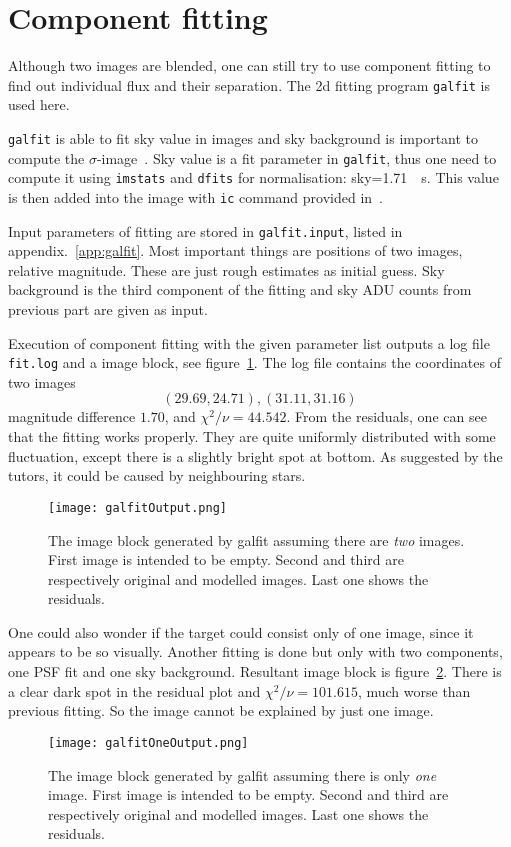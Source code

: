 \clearpage
\section{Component fitting}
Although two images are blended, one can still try to use component fitting to find out individual flux and their separation. The 2d fitting program \verb|galfit| is used here.

\verb|galfit| is able to fit sky value in images and sky background is important to compute the $\sigma$-image~\cite{galfitManual}. Sky value is a fit parameter in \verb|galfit|, thus one need to compute it using \verb|imstats| and \verb|dfits| for normalisation: sky=\SI{1.71}{\per\s}. This value is then added into the image with \verb|ic| command provided in~\cite{manual}.

Input parameters of fitting are stored in \verb|galfit.input|, listed in appendix.~\ref{app:galfit}. Most important things are positions of two images, relative magnitude. These are just rough estimates as initial guess. Sky background is the third component of the fitting and sky ADU counts from previous part are given as input.

Execution of component fitting with the given parameter list outputs a log file \verb|fit.log| and a image block, see figure~\ref{fig:galfitOut}. The log file contains the coordinates of two images
\begin{equation*}
	(29.69, 24.71), (31.11, 31.16)
\end{equation*}
magnitude difference $1.70$, and $\chi^2/\nu = \num{44.542}$. From the residuals, one can see that the fitting works properly. They are quite uniformly distributed with some fluctuation, except there is a slightly bright spot at bottom. As suggested by the tutors, it could be caused by neighbouring stars. 
\begin{figure}[ht]
	\centering
	\texttt{[image: galfitOutput.png]}
	\caption{The image block generated by galfit assuming there are \textit{two} images. First image is intended to be empty. Second and third are respectively original and modelled images. Last one shows the residuals.}%
	\label{fig:galfitOut}
\end{figure}

One could also wonder if the target could consist only of one image, since it appears to be so visually. Another fitting is done but only with two components, one PSF fit and one sky background. Resultant image block is figure~\ref{fig:galfitOneOut}. There is a clear dark spot in the residual plot and $\chi^2/\nu = 101.615$, much worse than previous fitting. So the image cannot be explained by just one image.
\begin{figure}[ht]
	\centering
	\texttt{[image: galfitOneOutput.png]}
	\caption{The image block generated by galfit assuming there is only \textit{one} image. First image is intended to be empty. Second and third are respectively original and modelled images. Last one shows the residuals.}%
	\label{fig:galfitOneOut}
\end{figure}

